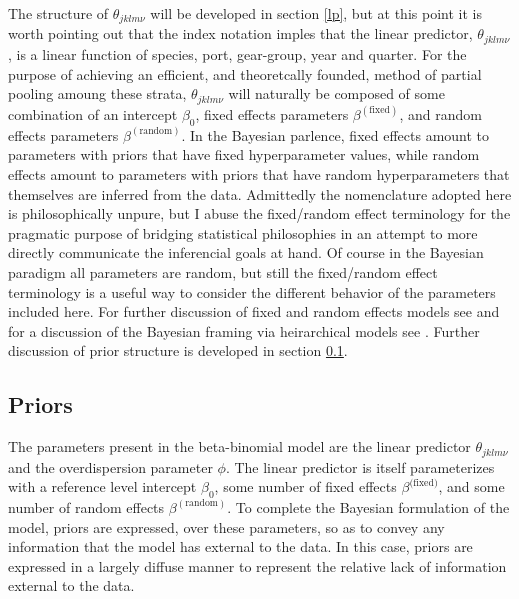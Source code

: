 \documentclass[12pt]{article}
\begin{document}
%
The structure of \(\theta_{jklm\nu}\) will be developed in section \ref{lp}, 
but at this point it is worth pointing out that the index notation imples that
the linear predictor, \(\theta_{jklm\nu}\), is a linear function of species, 
port, gear-group, year and quarter. For the purpose of achieving an efficient, 
and theoretcally founded, method of partial pooling amoung these strata, 
\(\theta_{jklm\nu}\) will naturally be composed of some combination of an 
intercept $\beta_0$, fixed effects parameters $\beta^{(\text{fixed})}$, and 
random effects parameters $\beta^{(\text{random})}$. In the Bayesian parlence, 
fixed effects amount to parameters with priors that have fixed hyperparameter 
values, while random effects amount to parameters with priors that have random 
hyperparameters that themselves are inferred from the data. Admittedly the 
nomenclature adopted here is philosophically unpure, but I abuse the 
fixed/random effect terminology for the pragmatic purpose of bridging 
statistical philosophies in an attempt to more directly communicate the 
inferencial goals at hand. Of course in the Bayesian paradigm all parameters 
are random, but still the fixed/random effect terminology is a useful way to 
consider the different behavior of the parameters included here. For further 
discussion of fixed and random effects models see 
\cite{nelder_generalized_1989} and for a discussion of the Bayesian framing 
via heirarchical models see \cite{gelman_bayesian_2013}. Further discussion of 
prior structure is developed in section \ref{priors}.

%

%
%
\subsection{Priors}\label{priors}
%
%

%
The parameters present in the beta-binomial model are the linear predictor 
\(\theta_{jklm\nu}\) and the overdispersion parameter $\phi$. The linear 
predictor is itself parameterizes with a reference level intercept $\beta_0$, 
some number of fixed effects $\beta^\text{(fixed)}$, and some number of random 
effects $\beta^{(\text{random})}$. To complete the Bayesian formulation of the 
model, priors are expressed, over these parameters, so as to convey any 
information that the model has external to the data. In this case, priors are 
expressed in a largely diffuse manner to represent the relative lack of 
information external to the data.  
\end{document}
